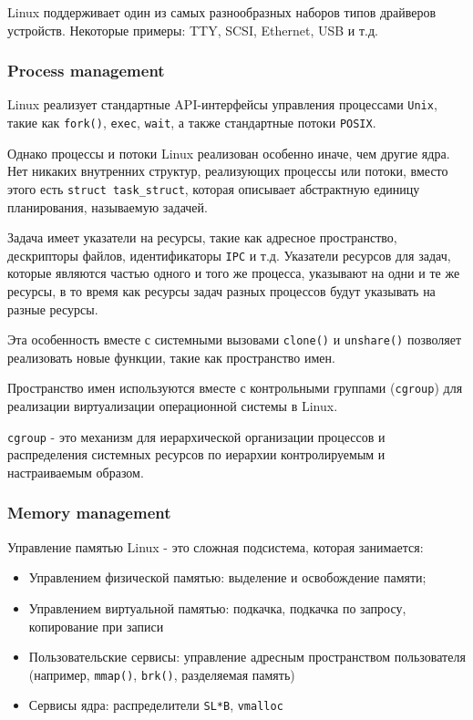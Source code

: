 \documentclass{article}
\begin{document}
    Linux поддерживает один из самых разнообразных наборов типов драйверов
    устройств.
    Некоторые примеры: TTY, SCSI, Ethernet, USB и т.д.

    \subsubsection{Process management}
    Linux реализует стандартные API-интерфейсы управления процессами \texttt{Unix}, такие
    как \texttt{fork()}, \texttt{exec}, \texttt{wait}, а также стандартные
    потоки \texttt{POSIX}.

    Однако процессы и потоки Linux реализован особенно иначе, чем другие ядра.
    Нет никаких внутренних структур, реализующих процессы или потоки, вместо
    этого есть \texttt{struct task\_struct}, которая описывает абстрактную
    единицу планирования, называемую задачей.

    Задача имеет указатели на ресурсы, такие как адресное пространство,
    дескрипторы файлов, идентификаторы \texttt{IPC} и т.д.
    Указатели ресурсов для задач, которые являются частью одного и того же
    процесса, указывают на одни и те же ресурсы, в то время как ресурсы задач
    разных процессов будут указывать на разные ресурсы.

    Эта особенность вместе с системными вызовами \texttt{clone()} и
    \texttt{unshare()} позволяет реализовать новые функции, такие как 
    пространство имен.

    Пространство имен используются вместе с контрольными группами (\texttt{cgroup})
    для реализации виртуализации операционной системы в Linux.

    \texttt{cgroup} - это механизм для иерархической организации процессов и
    распределения системных ресурсов по иерархии контролируемым и настраиваемым
    образом.

    \subsubsection{Memory management}
    Управление памятью Linux - это сложная подсистема, которая занимается:

    \begin{itemize}
        \item Управлением физической памятью: выделение и освобождение памяти;
        \item Управлением виртуальной памятью: подкачка, подкачка по запросу,
        копирование при записи
        \item Пользовательские сервисы: управление адресным пространством
        пользователя (например, \texttt{mmap()}, \texttt{brk()}, разделяемая 
        память)
        \item Сервисы ядра: распределители \texttt{SL*B}, \texttt{vmalloc}
    \end{itemize}
\end{document}
